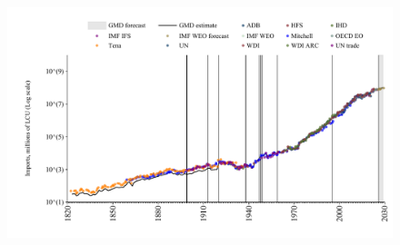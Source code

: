 \documentclass[12pt,a4paper,landscape]{article}
\begin{document}
\begin{adjustbox}{max totalsize={\paperwidth}{\paperheight},center}
\begin{minipage}[t][\textheight][t]{\textwidth}
\begin{figure}[H]
\includegraphics[width=\textwidth,height=0.6\textheight,keepaspectratio]{graphs/IND_imports.pdf}
\end{figure}
\end{minipage}
\end{adjustbox}
\end{document}
